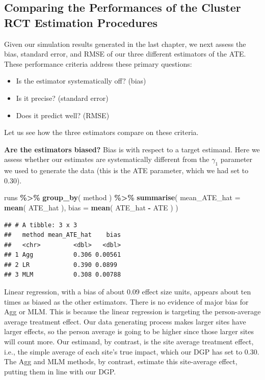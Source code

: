 \documentclass[
]{book}
\newenvironment{Shaded}{\begin{snugshade}}{\end{snugshade}}
\newcommand{\AttributeTok}[1]{\textcolor[rgb]{0.13,0.29,0.53}{#1}}
\newcommand{\FunctionTok}[1]{\textcolor[rgb]{0.13,0.29,0.53}{\textbf{#1}}}
\newcommand{\NormalTok}[1]{#1}
\newcommand{\SpecialCharTok}[1]{\textcolor[rgb]{0.81,0.36,0.00}{\textbf{#1}}}
\providecommand{\tightlist}{%
  \setlength{\itemsep}{0pt}\setlength{\parskip}{0pt}}
\begin{document}
\subsection{Comparing the Performances of the Cluster RCT Estimation Procedures}\label{comparing-the-performances-of-the-cluster-rct-estimation-procedures}

Given our simulation results generated in the last chapter, we next assess the bias, standard error, and RMSE of our three different estimators of the ATE.
These performance criteria address these primary questions:

\begin{itemize}
\tightlist
\item
  Is the estimator systematically off? (bias)
\item
  Is it precise? (standard error)
\item
  Does it predict well? (RMSE)
\end{itemize}

Let us see how the three estimators compare on these criteria.

\textbf{Are the estimators biased?}
Bias is with respect to a target estimand.
Here we assess whether our estimates are systematically different from the \(\gamma_1\) parameter we used to generate the data (this is the ATE parameter, which we had set to 0.30).

\begin{Shaded}
\begin{Highlighting}[]
\NormalTok{runs }\SpecialCharTok{\%\textgreater{}\%} 
  \FunctionTok{group\_by}\NormalTok{( method ) }\SpecialCharTok{\%\textgreater{}\%}
  \FunctionTok{summarise}\NormalTok{( }
    \AttributeTok{mean\_ATE\_hat =} \FunctionTok{mean}\NormalTok{( ATE\_hat ),}
    \AttributeTok{bias =} \FunctionTok{mean}\NormalTok{( ATE\_hat }\SpecialCharTok{{-}}\NormalTok{ ATE )  )}
\end{Highlighting}
\end{Shaded}

\begin{verbatim}
## # A tibble: 3 x 3
##   method mean_ATE_hat    bias
##   <chr>         <dbl>   <dbl>
## 1 Agg           0.306 0.00561
## 2 LR            0.390 0.0899 
## 3 MLM           0.308 0.00788
\end{verbatim}

Linear regression, with a bias of about 0.09 effect size units, appears about ten times as biased as the other estimators.
There is no evidence of major bias for Agg or MLM.
This is because the linear regression is targeting the person-average average treatment effect.
Our data generating process makes larger sites have larger effects, so the person average is going to be higher since those larger sites will count more.
Our estimand, by contrast, is the site average treatment effect, i.e., the simple average of each site's true impact, which our DGP has set to 0.30.
The Agg and MLM methods, by contrast, estimate this site-average effect, putting them in line with our DGP.
\end{document}
